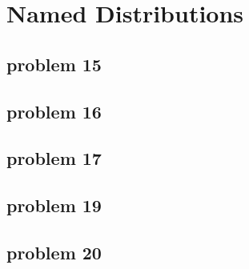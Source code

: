\section{Named Distributions}

\subsection{problem 15}


\subsection{problem 16}


\subsection{problem 17}


\subsection{problem 19}


\subsection{problem 20}

